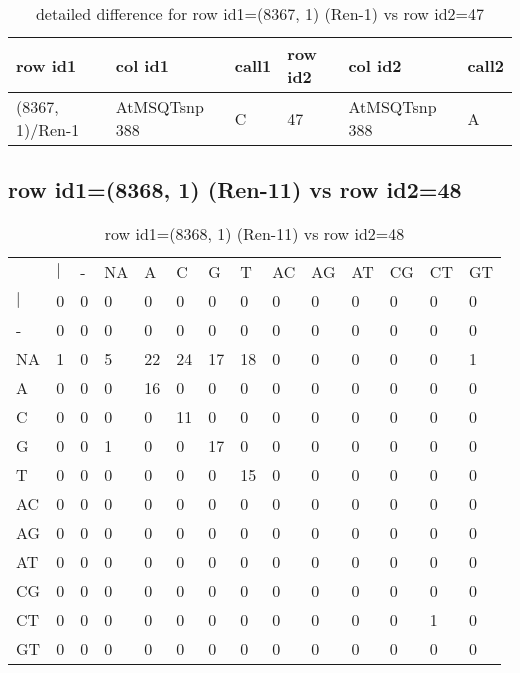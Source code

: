 \begin{center}
\begin{longtable}{|l|l|l|l|l|l|}
\caption{detailed difference for row id1=(8367, 1) (Ren-1) vs row id2=47} \label{table_dm405}\\
\hline
row id1&col id1&call1&row id2&col id2&call2\\
\hline
(8367, 1)/Ren-1&AtMSQTsnp 388&C&47&AtMSQTsnp 388&A\\
\hline
\end{longtable}
\end{center}

\subsection{row id1=(8368, 1) (Ren-11) vs row id2=48}
\begin{center}
\begin{longtable}{|l|l|l|l|l|l|l|l|l|l|l|l|l|l|}
\caption{row id1=(8368, 1) (Ren-11) vs row id2=48} \label{table_dm406}\\
\hline
\\
\hline
&$|$&-&NA&A&C&G&T&AC&AG&AT&CG&CT&GT\\
$|$&0&0&0&0&0&0&0&0&0&0&0&0&0\\
-&0&0&0&0&0&0&0&0&0&0&0&0&0\\
NA&1&0&5&22&24&17&18&0&0&0&0&0&1\\
A&0&0&0&16&0&0&0&0&0&0&0&0&0\\
C&0&0&0&0&11&0&0&0&0&0&0&0&0\\
G&0&0&1&0&0&17&0&0&0&0&0&0&0\\
T&0&0&0&0&0&0&15&0&0&0&0&0&0\\
AC&0&0&0&0&0&0&0&0&0&0&0&0&0\\
AG&0&0&0&0&0&0&0&0&0&0&0&0&0\\
AT&0&0&0&0&0&0&0&0&0&0&0&0&0\\
CG&0&0&0&0&0&0&0&0&0&0&0&0&0\\
CT&0&0&0&0&0&0&0&0&0&0&0&1&0\\
GT&0&0&0&0&0&0&0&0&0&0&0&0&0\\
\hline
\end{longtable}
\end{center}

